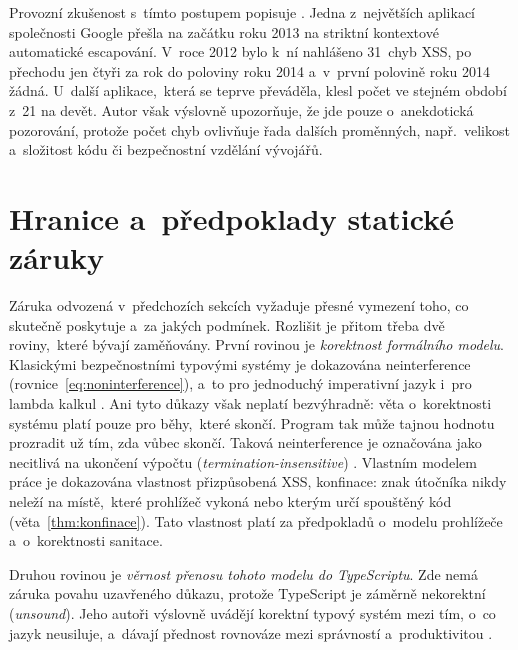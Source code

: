Provozní zkušenost s~tímto postupem popisuje \textcite{kern2014tangled}. Jedna z~největších aplikací společnosti Google přešla na začátku roku 2013 na striktní kontextové automatické escapování. V~roce 2012 bylo k~ní nahlášeno 31~chyb XSS, po přechodu jen čtyři za rok do poloviny roku 2014 a~v~první polovině roku 2014 žádná. U~další aplikace,~která se teprve převáděla, klesl počet ve stejném období z~21 na devět. Autor však výslovně upozorňuje, že jde pouze o~anekdotická pozorování, protože počet chyb ovlivňuje řada dalších proměnných, např.~velikost a~složitost kódu či bezpečnostní vzdělání vývojářů.

\section{Hranice a~předpoklady statické záruky}
\label{sec:hranice-zaruky}

Záruka odvozená v~předchozích sekcích vyžaduje přesné vymezení toho, co skutečně poskytuje a~za jakých podmínek. Rozlišit je přitom třeba dvě roviny,~které bývají zaměňovány. První rovinou je \emph{korektnost formálního modelu}. Klasickými bezpečnostními typovými systémy je dokazována neinterference (rovnice~\ref{eq:noninterference}), a~to pro jednoduchý imperativní jazyk \parencite{volpano1996sound} i~pro lambda kalkul \parencite{zdancewic2002thesis}. Ani tyto důkazy však neplatí bezvýhradně: věta o~korektnosti systému \textcite{volpano1996sound} platí pouze pro běhy,~které skončí. Program tak může tajnou hodnotu prozradit už tím, zda vůbec skončí. Taková neinterference je označována jako necitlivá na ukončení výpočtu (\emph{termination-insensitive}) \parencite{sabelfeld2003language}. Vlastním modelem práce je dokazována vlastnost přizpůsobená XSS, konfinace: znak útočníka nikdy neleží na místě,~které prohlížeč vykoná nebo kterým určí spouštěný kód (věta~\ref{thm:konfinace}). Tato vlastnost platí za předpokladů o~modelu prohlížeče a~o~korektnosti sanitace.

Druhou rovinou je \emph{věrnost přenosu tohoto modelu do TypeScriptu}. Zde nemá záruka povahu uzavřeného důkazu, protože TypeScript je záměrně nekorektní (\emph{unsound}). Jeho autoři výslovně uvádějí korektní typový systém mezi tím, o~co jazyk neusiluje, a~dávají přednost rovnováze mezi správností a~produktivitou \parencite{tsDesignGoals}.

